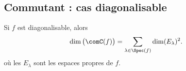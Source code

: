 \subsection{Commutant : cas diagonalisable}

\begin{proposition}      \label{PROPooRHHEooIRGmtl}
    Si \( f\) est diagonalisable, alors
    \begin{equation}        \label{EQooOTFLooPUKAos}
        \dim\big( \comC(f) \big)=\sum_{\lambda\in\Spec(f)}\dim(E_{\lambda})^2.
    \end{equation}
    où les \( E_{\lambda} \) sont les espaces propres de \( f\).
\end{proposition}

